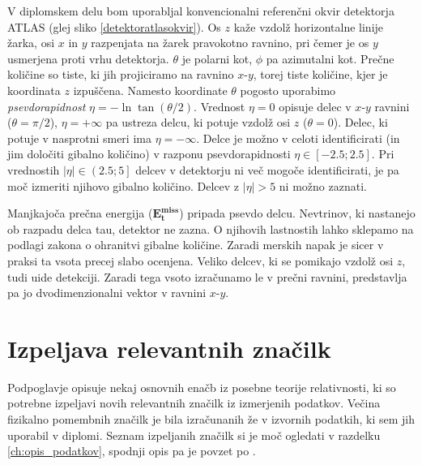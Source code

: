 \documentclass[11pt,a4paper,openany]{book}
\begin{document}
V diplomskem delu bom uporabljal konvencionalni referenčni okvir detektorja ATLAS (glej sliko \ref{detektoratlasokvir}). Os $z$ kaže vzdolž horizontalne linije žarka, osi $x$ in $y$ razpenjata na žarek pravokotno ravnino, pri čemer je os $y$ usmerjena proti vrhu detektorja. $\theta$ je polarni kot, $\phi$ pa azimutalni kot. Prečne količine so tiste, ki jih projiciramo na ravnino $x\text{-}y$, torej tiste količine, kjer je koordinata $z$ izpuščena. Namesto koordinate $\theta$ pogosto uporabimo \textit{psevdorapidnost} $\eta = -\ln \tan(\theta/2)$. Vrednost $\eta = 0$ opisuje delec v $x\text{-}y$ ravnini ($\theta = \pi/2$), $\eta = +\infty$ pa ustreza delcu, ki potuje vzdolž osi $z$ ($\theta = 0$). Delec, ki potuje v nasprotni smeri ima $\eta = -\infty$. Delce je možno v celoti identificirati (in jim določiti gibalno količino) v razponu psevdorapidnosti $\eta \in \left[-\num{2,5}; \num{2,5} \right]$. Pri vrednostih $|\eta| \in \left(\num{2,5}; 5\right]$ delcev v detektorju ni več mogoče identificirati, je pa moč izmeriti njihovo gibalno količino. Delcev z $|\eta| > 5$ ni možno zaznati.

Manjkajoča prečna energija ($\mathbf{E^{miss}_t}$) pripada psevdo delcu. Nevtrinov, ki nastanejo ob razpadu delca tau, detektor ne zazna. O njihovih lastnostih lahko sklepamo na podlagi zakona o ohranitvi gibalne količine. Zaradi merskih napak je sicer v praksi ta vsota precej slabo ocenjena. Veliko delcev, ki se pomikajo vzdolž osi $z$, tudi uide detekciji. Zaradi tega vsoto izračunamo le v prečni ravnini, predstavlja pa jo dvodimenzionalni vektor v ravnini $x\text{-}y$.

\section{Izpeljava relevantnih značilk}
Podpoglavje opisuje nekaj osnovnih enačb iz posebne teorije relativnosti, ki so potrebne izpeljavi novih relevantnih značilk iz izmerjenih podatkov. Večina fizikalno pomembnih značilk je bila izračunanih že v izvornih podatkih, ki sem jih uporabil v diplomi. Seznam izpeljanih značilk si je moč ogledati v razdelku \ref{ch:opis_podatkov}, spodnji opis pa je povzet po \cite{ChallengeDoc}.
\end{document}
